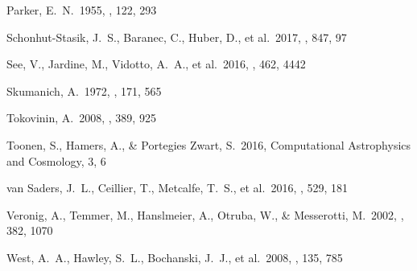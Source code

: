 \documentclass[preprint2]{aastex61}
\begin{document}
\begin{thebibliography}{}
 Parker, E.~N.\ 1955, \apj, 122, 293 


 Schonhut-Stasik, J.~S., Baranec, C., Huber, D., et al.\ 2017, \apj, 847, 97 



 See, V., Jardine, M., Vidotto, A.~A., et al.\ 2016, \mnras, 462, 4442 

 Skumanich, A.\ 1972, \apj, 171, 565

 Tokovinin, A.\ 2008, \mnras, 389, 925

 Toonen, S., Hamers, A., \& Portegies Zwart, S.\ 2016, Computational Astrophysics and Cosmology, 3, 6 

 van Saders, J.~L., Ceillier, T., Metcalfe, T.~S., et al.\ 2016, \nat, 529, 181 

 Veronig, A., Temmer, M., Hanslmeier, A., Otruba, W., \& Messerotti, M.\ 2002, \aap, 382, 1070

 West, A.~A., Hawley, S.~L., Bochanski, J.~J., et al.\ 2008, \aj, 135, 785 

\end{thebibliography}
\end{document}
